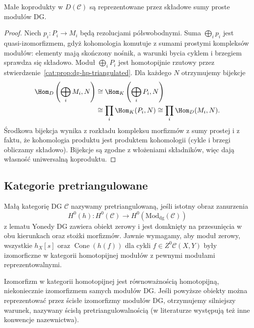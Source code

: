 \begin{wniosek}\label{cat:cor:dg-derived-coproduct}
Małe koprodukty w $D(\mathcal C)$ są reprezentowane przez składowe sumy proste modułów DG.
\end{wniosek}
\begin{proof}
Niech $p_i:P_i\to M_i$ będą rezolucjami półswobodnymi. Suma $\bigoplus_i p_i$ jest quasi-izomorfizmem, gdyż kohomologia komutuje z sumami prostymi kompleksów modułów: elementy mają skończony nośnik, a warunki bycia cyklem i brzegiem sprawdza się składowo. Moduł $\bigoplus_i P_i$ jest homotopijnie rzutowy przez stwierdzenie~\ref{cat:prop:dg-hp-triangulated}. Dla każdego $N$ otrzymujemy bijekcje
\[
\begin{aligned}
 \Hom_D\left(\bigoplus_iM_i,N\right)
 &\cong\Hom_K\left(\bigoplus_iP_i,N\right)\\
 &\cong\prod_i\Hom_K(P_i,N)
 \cong\prod_i\Hom_D(M_i,N).
\end{aligned}
\]
Środkowa bijekcja wynika z rozkładu kompleksu morfizmów z sumy prostej i z faktu, że kohomologia produktu jest produktem kohomologii (cykle i brzegi obliczamy składowo). Bijekcje są zgodne z włożeniami składników, więc dają własność uniwersalną koproduktu.
\end{proof}

\subsection{Kategorie pretriangulowane}

\begin{definicja}\label{cat:def:dg-pretriangulated}
Małą kategorię DG $\mathcal C$ nazywamy pretriangulowaną, jeśli istotny obraz zanurzenia
\[
 H^0(h):H^0(\mathcal C)\longrightarrow
 H^0(\mathrm{Mod}_{\mathrm{dg}}(\mathcal C))
\]
z lematu Yonedy DG zawiera obiekt zerowy i jest domknięty na przesunięcia w obu kierunkach oraz stożki morfizmów. Jawnie wymagamy, aby moduł zerowy, wszystkie $h_X[s]$ oraz $\operatorname{Cone}(h(f))$ dla cykli $f\in Z^0\mathcal C(X,Y)$ były izomorficzne w kategorii homotopijnej modułów z pewnymi modułami reprezentowalnymi.
\end{definicja}

Izomorfizm w kategorii homotopijnej jest równoważnością homotopijną, niekoniecznie izomorfizmem samych modułów DG. Jeśli powyższe obiekty można reprezentować przez ścisłe izomorfizmy modułów DG, otrzymujemy silniejszy warunek, nazywany ścisłą pretriangulowalnością (w literaturze występują też inne konwencje nazewnictwa).

